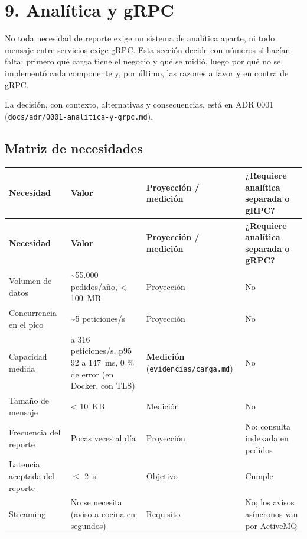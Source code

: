 
\section{9. Analítica y gRPC}

No toda necesidad de reporte exige un sistema de analítica aparte, ni todo mensaje entre servicios exige gRPC. Esta sección decide con números si hacían falta: primero qué carga tiene el negocio y qué se midió, luego por qué no se implementó cada componente y, por último, las razones a favor y en contra de gRPC.


La decisión, con contexto, alternativas y consecuencias, está en ADR 0001 (\texttt{docs/\allowbreak{}adr/\allowbreak{}0001-\allowbreak{}analitica-\allowbreak{}y-\allowbreak{}grpc.\allowbreak{}md}).


\subsection{Matriz de necesidades}

{\small
\setlength{\tabcolsep}{3pt}\renewcommand{\arraystretch}{1.15}
\begin{longtable}{|>{\raggedright\arraybackslash}p{}|>{\raggedright\arraybackslash}p{}|>{\raggedright\arraybackslash}p{}|>{\raggedright\arraybackslash}p{}|}
\hline
\textbf{Necesidad} & \textbf{Valor} & \textbf{Proyección / medición} & \textbf{¿Requiere analítica separada o gRPC?} \\ \hline
\endfirsthead
\hline
\textbf{Necesidad} & \textbf{Valor} & \textbf{Proyección / medición} & \textbf{¿Requiere analítica separada o gRPC?} \\ \hline
\endhead
Volumen de datos & \textasciitilde{}55.000 pedidos/año, < 100~MB & Proyección & No \\ \hline
Concurrencia en el pico & \textasciitilde{}5 peticiones/s & Proyección & No \\ \hline
Capacidad medida & 209 a 316 peticiones/s, p95 92 a 147~ms, 0 \% de error (en Docker, con TLS) & \textbf{Medición} (\texttt{evidencias/\allowbreak{}carga.\allowbreak{}md}) & No \\ \hline
Tamaño de mensaje & < 10~KB & Medición & No \\ \hline
Frecuencia del reporte & Pocas veces al día & Proyección & No: consulta indexada en pedidos \\ \hline
Latencia aceptada del reporte & $\leq$ 2~s & Objetivo & Cumple \\ \hline
Streaming & No se necesita (aviso a cocina en segundos) & Requisito & No; los avisos asíncronos van por ActiveMQ \\ \hline
\end{longtable}
}

